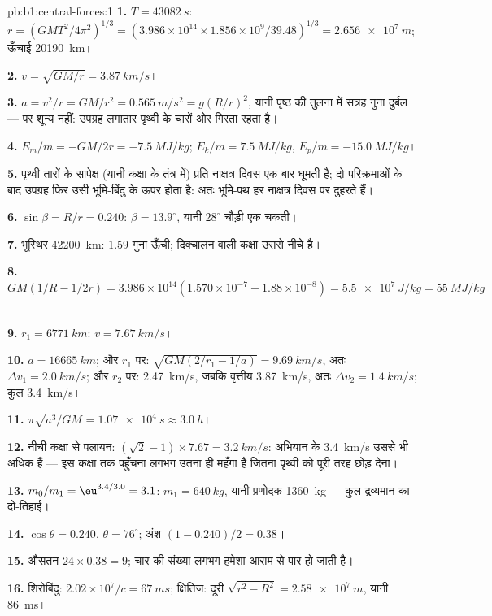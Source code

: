 \begin{solution}{pb:b1:central-forces:1}
\textbf{1.} $T = \qty{43082}{s}$: $r = (GMT^2/4\pi^2)^{1/3} = (3.986\times10^{14}
\times 1.856\times10^9/39.48)^{1/3} = \qty{2.656e7}{m}$; ऊँचाई
\qty{20190}{km}।

\textbf{2.} $v = \sqrt{GM/r} = \qty{3.87}{km/s}$।

\textbf{3.} $a = v^2/r = GM/r^2 = \qty{0.565}{m/s^2} = g(R/r)^2$, यानी पृष्ठ
की तुलना में सत्रह गुना दुर्बल --- पर शून्य नहीं: उपग्रह लगातार पृथ्वी के
चारों ओर गिरता रहता है।

\textbf{4.} $E_m/m = -GM/2r = \qty{-7.5}{MJ/kg}$; $E_k/m = \qty{+7.5}{MJ/kg}$,
$E_p/m = \qty{-15.0}{MJ/kg}$।

\textbf{5.} पृथ्वी तारों के सापेक्ष (यानी कक्षा के तंत्र में) प्रति
नाक्षत्र दिवस एक बार घूमती है; दो परिक्रमाओं के बाद उपग्रह फिर उसी भूमि-बिंदु
के ऊपर होता है: अतः भूमि-पथ हर नाक्षत्र दिवस पर दुहरते हैं।

\textbf{6.} $\sin\beta = R/r = 0.240$: $\beta = 13.9^\circ$, यानी
$28^\circ$ चौड़ी एक चकती।

\textbf{7.} भूस्थिर \qty{42200}{km}: $1.59$ गुना ऊँची; दिक्चालन वाली कक्षा
उससे नीचे है।

\textbf{8.} $GM(1/R - 1/2r) = 3.986\times10^{14}(1.570\times10^{-7} - 1.88\times
10^{-8}) = \qty{5.5e7}{J/kg} = \qty{55}{MJ/kg}$।

\textbf{9.} $r_1 = \qty{6771}{km}$: $v = \qty{7.67}{km/s}$।

\textbf{10.} $a = \qty{16665}{km}$;
और $r_1$ पर: $\sqrt{GM(2/r_1 - 1/a)} = \qty{9.69}{km/s}$,
अतः $\Delta v_1 = \qty{2.0}{km/s}$; और $r_2$ पर: \qty{2.47}{km/s},
जबकि वृत्तीय \qty{3.87}{km/s}, अतः $\Delta v_2 = \qty{1.4}{km/s}$; कुल
\qty{3.4}{km/s}।

\textbf{11.} $\pi\sqrt{a^3/GM} = \qty{1.07e4}{s} \approx \qty{3.0}{h}$।

\textbf{12.} नीची कक्षा से पलायन: $(\sqrt2 - 1)\times 7.67 = \qty{3.2}{km/s}$:
अभियान के \qty{3.4}{km/s} उससे भी अधिक हैं --- इस कक्षा तक पहुँचना लगभग
उतना ही महँगा है जितना पृथ्वी को पूरी तरह छोड़ देना।

\textbf{13.} $m_0/m_1 = \eu^{3.4/3.0} = 3.1$: $m_1 = \qty{640}{kg}$, यानी
प्रणोदक \qty{1360}{kg} --- कुल द्रव्यमान का दो-तिहाई।

\textbf{14.} $\cos\theta = 0.240$, $\theta = 76^\circ$; अंश $(1 - 0.240)/2
= 0.38$।

\textbf{15.} औसतन $24 \times 0.38 = 9$; चार की संख्या लगभग हमेशा आराम से
पार हो जाती है।

\textbf{16.} शिरोबिंदु: $2.02\times10^7/c = \qty{67}{ms}$; क्षितिज: दूरी
$\sqrt{r^2 - R^2} = \qty{2.58e7}{m}$, यानी \qty{86}{ms}।


\end{solution}
